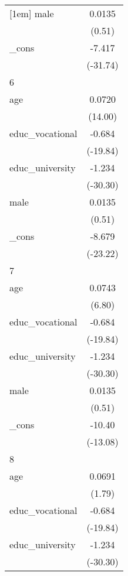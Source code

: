 {\begin{tabular}{l*{1}{c}}
[1em]
male        &      0.0135         \\
            &      (0.51)         \\
[1em]
\_cons      &      -7.417\sym{***}\\
            &    (-31.74)         \\
\hline
6           &                     \\
age         &      0.0720\sym{***}\\
            &     (14.00)         \\
[1em]
educ\_vocational&      -0.684\sym{***}\\
            &    (-19.84)         \\
[1em]
educ\_university&      -1.234\sym{***}\\
            &    (-30.30)         \\
[1em]
male        &      0.0135         \\
            &      (0.51)         \\
[1em]
\_cons      &      -8.679\sym{***}\\
            &    (-23.22)         \\
\hline
7           &                     \\
age         &      0.0743\sym{***}\\
            &      (6.80)         \\
[1em]
educ\_vocational&      -0.684\sym{***}\\
            &    (-19.84)         \\
[1em]
educ\_university&      -1.234\sym{***}\\
            &    (-30.30)         \\
[1em]
male        &      0.0135         \\
            &      (0.51)         \\
[1em]
\_cons      &      -10.40\sym{***}\\
            &    (-13.08)         \\
\hline
8           &                     \\
age         &      0.0691         \\
            &      (1.79)         \\
[1em]
educ\_vocational&      -0.684\sym{***}\\
            &    (-19.84)         \\
[1em]
educ\_university&      -1.234\sym{***}\\
            &    (-30.30)         \\

\end{tabular}}
